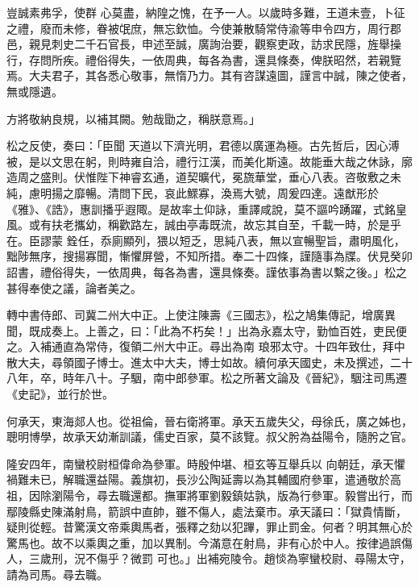 \begin{pinyinscope}
 豈誠素弗孚，使群
 心莫盡，納隍之愧，在予一人。以歲時多難，王道未壹，卜征之禮，廢而未修，眷被氓庶，無忘欽恤。今使兼散騎常侍渝等申令四方，周行郡邑，親見刺史二千石官長，申述至誠，廣詢治要，觀察吏政，訪求民隱，旌舉操行，存問所疾。禮俗得失，一依周典，每各為書，還具條奏，俾朕昭然，若親覽焉。大夫君子，其各悉心敬事，無惰乃力。其有咨謀遠圖，謹言中誠，陳之使者，無或隱遺。



 方將敬納良規，以補其闕。勉哉勖之，稱朕意焉。」



 松之反使，奏曰：「臣聞
 天道以下濟光明，君德以廣運為極。古先哲后，因心溥被，是以文思在躬，則時雍自洽，禮行江漢，而美化斯遠。故能垂大哉之休詠，廓造周之盛則。伏惟陛下神睿玄通，道契曠代，冕旒華堂，垂心八表。咨敬敷之未純，慮明揚之靡暢。清問下民，哀此鰥寡，渙焉大號，周爰四達。遠猷形於《雅》、《誥》，惠訓播乎遐陬。是故率土仰詠，重譯咸說，莫不謳吟踴躍，式銘皇風。或有扶老攜幼，稱歡路左，誠由亭毒既流，故忘其自至，千載一時，於是乎在。臣謬蒙
 銓任，忝廁顯列，猥以短乏，思純八表，無以宣暢聖旨，肅明風化，黜陟無序，搜揚寡聞，慚懼屏營，不知所措。奉二十四條，謹隨事為牒。伏見癸卯詔書，禮俗得失，一依周典，每各為書，還具條奏。謹依事為書以繫之後。」松之甚得奉使之議，論者美之。



 轉中書侍郎、司冀二州大中正。上使注陳壽《三國志》，松之鳩集傳記，增廣異聞，既成奏上。上善之，曰：「此為不朽矣！」出為永嘉太守，勤恤百姓，吏民便之。入補通直為常侍，復領二州大中正。尋出為南
 琅邪太守。十四年致仕，拜中散大夫，尋領國子博士。進太中大夫，博士如故。續何承天國史，未及撰述，二十八年，卒，時年八十。子駰，南中郎參軍。松之所著文論及《晉紀》，駰注司馬遷《史記》，並行於世。



 何承天，東海郯人也。從祖倫，晉右衛將軍。承天五歲失父，母徐氏，廣之姊也，聰明博學，故承天幼漸訓議，儒史百家，莫不該覽。叔父肹為益陽令，隨肹之官。



 隆安四年，南蠻校尉桓偉命為參軍。時殷仲堪、桓玄等互舉兵以
 向朝廷，承天懼禍難未已，解職還益陽。義旗初，長沙公陶延壽以為其輔國府參軍，遣通敬於高祖，因除瀏陽令，尋去職還都。撫軍將軍劉毅鎮姑孰，版為行參軍。毅嘗出行，而鄢陵縣史陳滿射鳥，箭誤中直帥，雖不傷人，處法棄市。承天議曰：「獄貴情斷，疑則從輕。昔驚漢文帝乘輿馬者，張釋之劾以犯蹕，罪止罰金。何者？明其無心於驚馬也。故不以乘輿之重，加以異制。今滿意在射鳥，非有心於中人。按律過誤傷人，三歲刑，況不傷乎？微罰
 可也。」出補宛陵令。趙惔為寧蠻校尉、尋陽太守，請為司馬。尋去職。




\end{pinyinscope}
